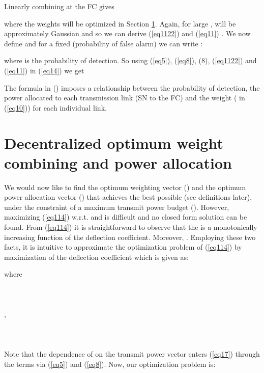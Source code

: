 \documentclass[conference]{IEEEtran}
\begin{document}
Linearly combining  at the FC gives

where the weights  will be optimized in Section \ref{Decentralized optimum weight combining and power allocation}. Again, for large ,  will be approximately Gaussian and so we can derive (\ref{eq1122}) and (\ref{eq11}) . We now define  and for a fixed  (probability of false alarm) we can write \cite{les96}:
\begin{figure*}[h!tb]

\vspace*{-0.4cm}

\hrulefill
\vspace*{-12pt}
\end{figure*}


where  is the probability of detection.
So using (\ref{eq5}), (\ref{eq8}), (8), (\ref{eq1122}) and (\ref{eq11}) in (\ref{eq14}) we get 

The formula in () imposes a relationship between the probability of detection, the power allocated to each transmission link (SN to the FC) and the weight ( in (\ref{eq10})) for each individual link. 
\section{Decentralized optimum weight combining and power allocation}
\label{Decentralized optimum weight combining and power allocation}
We would now like to find the optimum weighting vector () and the optimum power allocation vector () that achieves the best possible  (see definitions later), under the constraint of a maximum transmit power budget (). However, maximizing  (\ref{eq114}) w.r.t.  and  is difficult and no closed form solution can be found. From (\ref{eq114}) it is straightforward to observe that the  is a monotonically increasing function of the deflection coefficient. Moreover, . Employing these two facts, it is intuitive to approximate the optimization problem of (\ref{eq114}) by maximization of the deflection coefficient which is given as:

where \\ \\
\hspace{-0.1cm} \quad \\  \\
,  \\ \\
   \\ \\
Note that the dependence of  on the transmit power vector  enters (\ref{eq17}) through the  terms via (\ref{eq5}) and (\ref{eq8}). 
Now, our optimization problem is:
\end{document}
